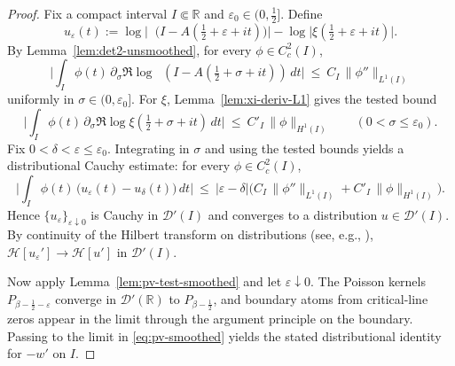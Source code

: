\documentclass[11pt]{article}
\newcommand{\Hilb}{\mathcal H}
\theoremstyle{definition}
\theoremstyle{remark}
\theoremstyle{definition}
\newcommand{\R}{\mathbb{R}}
\DeclareMathOperator{\dettwo}{det_2}
\begin{document}
\begin{proof}
Fix a compact interval $I\Subset\R$ and $\varepsilon_0\in(0,\tfrac12]$. Define
\[
 u_\varepsilon(t):=\log\Big|\dettwo\big(I-A(\tfrac12+\varepsilon+it)\big)\Big|-\log\Big|\xi(\tfrac12+\varepsilon+it)\Big|.
\]
By Lemma~\ref{lem:det2-unsmoothed}, for every $\phi\in C_c^2(I)$,
\[
 \Big|\!\int_I \!\phi(t)\,\partial_\sigma\Re\log\dettwo(I\! -\!A(\tfrac12\!+\!\sigma\!+\!it))\,dt\Big|\ \le\ C_I\,\|\phi''\|_{L^1(I)}
\]
uniformly in $\sigma\in(0,\varepsilon_0]$. For $\xi$, Lemma~\ref{lem:xi-deriv-L1} gives the tested bound
\[
 \Big|\int_I \phi(t)\,\partial_\sigma\Re\log\xi(\tfrac12+\sigma+it)\,dt\Big|\ \le\ C'_I\,\|\phi\|_{H^1(I)}\qquad(0<\sigma\le \varepsilon_0).
\]
Fix $0<\delta<\varepsilon\le \varepsilon_0$. Integrating in $\sigma$ and using the tested bounds yields a distributional Cauchy estimate: for every $\phi\in C_c^2(I)$,
\[
  \Big|\int_I \phi(t)\,\big(u_\varepsilon(t)-u_\delta(t)\big)\,dt\Big|
  \ \le\ |\varepsilon-\delta|\Big(C_I\,\|\phi''\|_{L^1(I)}+C'_I\,\|\phi\|_{H^1(I)}\Big).
\]
Hence $\{u_\varepsilon\}_{\varepsilon\downarrow 0}$ is Cauchy in $\mathcal D'(I)$ and converges to a distribution $u\in\mathcal D'(I)$. By continuity of the Hilbert transform on distributions (see, e.g., \cite[Ch.~II]{SteinHA}), $\Hilb[u_\varepsilon']\to \Hilb[u']$ in $\mathcal D'(I)$.

Now apply Lemma~\ref{lem:pv-test-smoothed} and let $\varepsilon\downarrow 0$.
The Poisson kernels $P_{\beta-\tfrac12-\varepsilon}$ converge in $\mathcal D'(\R)$ to $P_{\beta-\tfrac12}$, and boundary atoms from critical-line zeros appear in the limit through the argument principle on the boundary. Passing to the limit in \eqref{eq:pv-smoothed} yields the stated distributional identity for $-w'$ on $I$.
\end{proof}
\end{document}

